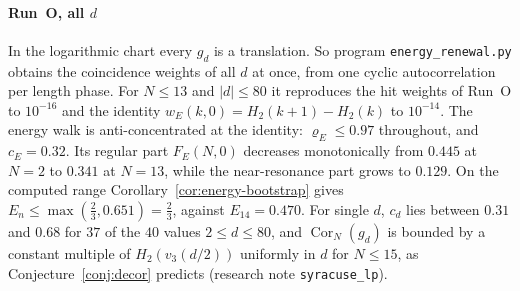 \documentclass[12pt]{amsart}
\theoremstyle{definition}
\theoremstyle{remark}
\begin{document}
\paragraph{Run~O, all $d$} In the logarithmic chart every $g_d$ is a translation. So program \texttt{energy\_renewal.py} obtains the coincidence weights of all $d$ at once, from one cyclic autocorrelation per length phase. For $N\le13$ and $|d|\le80$ it reproduces the hit weights of Run~O to $10^{-16}$ and the identity $w_E(k,0)=H_2(k+1)-H_2(k)$ to $10^{-14}$. The energy walk is anti-concentrated at the identity: $\varrho_E\le0.97$ throughout, and $c_E=0.32$. Its regular part $F_E(N,0)$ decreases monotonically from $0.445$ at $N=2$ to $0.341$ at $N=13$, while the near-resonance part grows to $0.129$. On the computed range Corollary~\ref{cor:energy-bootstrap} gives $E_n\le\max(\frac23,0.651)=\frac23$, against $E_{14}=0.470$. For single $d$, $c_d$ lies between $0.31$ and $0.68$ for $37$ of the $40$ values $2\le d\le80$, and $\operatorname{Cor}_N(g_d)$ is bounded by a constant multiple of $H_2(v_3(d/2))$ uniformly in $d$ for $N\le15$, as Conjecture~\ref{conj:decor} predicts (research note \texttt{syracuse\_lp}).
\end{document}
